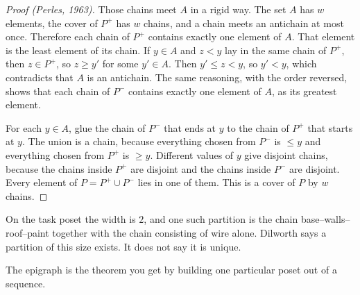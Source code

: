 \begin{proof}[Proof (Perles, 1963)]
Those chains meet $A$ in a rigid way. The set $A$ has $w$ elements, the cover of $P^+$ has $w$ chains, and a chain meets an antichain at most once. Therefore each chain of $P^+$ contains exactly one element of $A$. That element is the least element of its chain. If $y\in A$ and $z<y$ lay in the same chain of $P^+$, then $z\in P^+$, so $z\ge y'$ for some $y'\in A$. Then $y'\le z<y$, so $y'<y$, which contradicts that $A$ is an antichain. The same reasoning, with the order reversed, shows that each chain of $P^-$ contains exactly one element of $A$, as its greatest element.

For each $y\in A$, glue the chain of $P^-$ that ends at $y$ to the chain of $P^+$ that starts at $y$. The union is a chain, because everything chosen from $P^-$ is $\le y$ and everything chosen from $P^+$ is $\ge y$. Different values of $y$ give disjoint chains, because the chains inside $P^+$ are disjoint and the chains inside $P^-$ are disjoint. Every element of $P=P^+\cup P^-$ lies in one of them. This is a cover of $P$ by $w$ chains.
\end{proof}

On the task poset the width is $2$, and one such partition is the chain base--walls--roof--paint together with the chain consisting of wire alone. Dilworth says a partition of this size exists. It does not say it is unique.

The epigraph is the theorem you get by building one particular poset out of a sequence.

